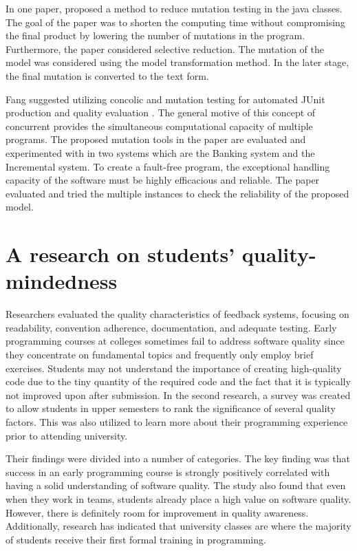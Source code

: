 In one paper, \cite{ref36} proposed a method to reduce mutation testing in the java classes. The goal of the paper was to shorten the computing time without compromising the final product by lowering the number of mutations in the program. Furthermore, the paper considered selective reduction. The mutation of the model was considered using the model transformation method. In the later stage, the final mutation is converted to the text form. \par 
Fang suggested utilizing concolic and mutation testing for automated JUnit production and quality evaluation \cite{ref37}. The general motive of this concept of concurrent provides the simultaneous computational capacity of multiple programs. The proposed mutation tools in the paper are evaluated and experimented with in two systems which are the Banking system and the Incremental system. To create a fault-free program, the exceptional handling capacity of the software must be highly efficacious and reliable. The paper evaluated and tried the multiple instances to check the reliability of the proposed model.
\section{A research on students' quality-mindedness}
Researchers \cite{ref38} evaluated the quality characteristics of feedback systems, focusing on readability, convention adherence, documentation, and adequate testing. Early programming courses at colleges sometimes fail to address software quality since they concentrate on fundamental topics and frequently only employ brief exercises. Students may not understand the importance of creating high-quality code due to the tiny quantity of the required code and the fact that it is typically not improved upon after submission. In the second research, a survey was created to allow students in upper semesters to rank the significance of several quality factors. This was also utilized to learn more about their programming experience prior to attending university.\par 
Their findings were divided into a number of categories. The key finding was that success in an early programming course is strongly positively correlated with having a solid understanding of software quality. The study also found that even when they work in teams, students already place a high value on software quality. However, there is definitely room for improvement in quality awareness. Additionally, research has indicated that university classes are where the majority of students receive their first formal training in programming.

